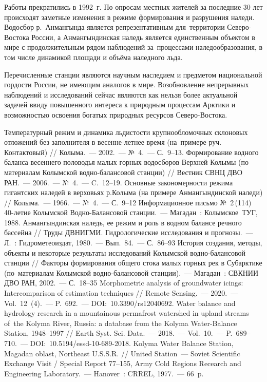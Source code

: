 Работы прекратились в 1992~г. По опросам местных жителей за последние 30 лет происходят заметные изменения в режиме формирования и разрушения наледи. Водосбор р.~Анмангында является репрезентативным для~территории Северо-Востока России, а Анмангындинская наледь является единственным объектом в мире с продолжительным рядом наблюдений за~процессами наледообразования, в том числе динамикой площади и объёма наледного льда.

Перечисленные станции являются научным наследием и предметом национальной гордости России, не имеющим аналогов в мире. Возобновление непрерывных наблюдений и исследований сейчас являются как нельзя более актуальной задачей ввиду повышенного интереса к природным процессам Арктики и возможностью освоения богатых природных ресурсов Северо-Востока.

\begin{thebibliography}{99}
\bibitem{} Температурный режим и динамика льдистости крупнообломочных склоновых отложений без заполнителя в весенне-летнее время (на~примере руч. Контактовый) // Колыма.~--- 2002.~--- №~4.~--- С.~9--13.
\bibitem{} Формирование водного баланса весеннего половодья малых горных водосборов Верхней Колымы (по материалам Колымской водно-балансовой станции) // Вестник СВНЦ ДВО РАН.~--- 2006.~--- №~4.~--- C.~12--19.
\bibitem{} Основные закономерности режима гигантских наледей в верховьях р.Колыма (на примере Анмангындинской наледи) // Колыма.~--- 1966.~--- №~4.~--- С.~9--12
\bibitem{}Информационное письмо №~2\,(114) 40-летие Колымской Водно-Балансовой станции.~--- Магадан~:  Колымское~ТУГ, 1988.
\bibitem{} Анмангындинская наледь, ее режим и роль в водном балансе речного бассейна // Труды ДВНИГМИ. Гидрологические исследования и прогнозы.~--- Л.~: Гидрометеоиздат, 1980.~--- Вып.~84.~--- С.~86--93
\bibitem{} История создания, методы, объекты и некоторые результаты исследований Колымской водно-балансовой станции // Факторы формирования общего стока малых горных рек в Субарктике (по~материалам Колымской водно-балансовой станции).~--- Магадан~: СВКНИИ ДВО РАН, 2002.~--- С.~18--35
\bibitem{} Morphometric analysis of groundwater icings: Intercomparison of estimation techniques // Remote Sensing.~--- 2020.~--- Vol.~12~(4).~--- P.~692.~--- DOI:~10.3390/rs12040692.
\bibitem{} Water balance and hydrology research in a mountainous permafrost watershed in upland streams of~the Kolyma River, Russia: a database from the Kolyma Water-Balance Station, 1948–1997 // Earth Syst. Sci. Data.~--- 2018.~--- Vol.~10.~--- P.~689--710.~--- DOI:~10.5194/essd-10-689-2018.
\bibitem{} Kolyma Water Balance Station, Magadan oblast, Northeast U.S.S.R. // United Station~--- Soviet Scientific Exchange Visit / Special Report 77--155, Army Cold Regions Recearch and Engineering Laboratory.~--- Hanover~: CRREL, 1977.~--- 66~p.
\end{thebibliography}
